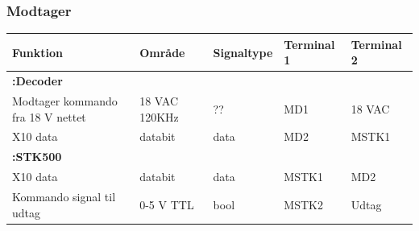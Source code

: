 \subsubsection{Modtager}
\begin{tabular}{|p{3cm}|p{}|p{}|p{}|p{}|}
\hline 
\textbf{Funktion} &\textbf{Område} &\textbf{Signaltype} &\textbf{Terminal 1} &\textbf{Terminal 2} \\ 
\hline 
\multicolumn{5}{|l|}{\textbf{:Decoder}} \\ 
\hline 
Modtager kommando fra 18 V nettet &18 VAC \newline 120KHz &?? &MD1 &18 VAC\\ 
\hline 
X10 data &databit &data &MD2 &MSTK1\\ 
\hline 
\multicolumn{5}{|l|}{\textbf{:STK500}} \\ 
\hline 
X10 data &databit &data &MSTK1 &MD2\\ 
\hline 
Kommando signal til udtag  &0-5 V TTL &bool &MSTK2 &Udtag\\ 
\hline 

\end{tabular} 
